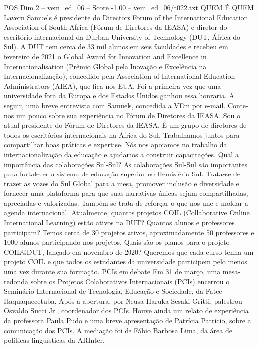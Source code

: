 \begin{textsample}{POS Dim 2 – vem\_ed\_06 – Score -1.00 – vem\_ed\_06/t022.txt}  \label{ex:f2_pos_045}
QUEM É QUEM Lavern Samuels é presidente do Directors Forum of the International Education Association of South Africa (Fórum de Diretores da IEASA) e diretor do escritório internacional da Durban University of Technology (DUT, África do Sul).
A DUT tem cerca de 33 mil alunos em seis faculdades e recebeu em fevereiro de 2021 o Global Award for Innovation and Excellence in Internationalisation (Prêmio Global pela Inovação e Excelência na Internacionalização), concedido pela Association of International Education Administrators (AIEA), que fica nos EUA.
Foi a primeira vez que uma universidade fora da Europa e dos Estados Unidos ganhou essa honraria.
A seguir, uma breve entrevista com Samuels, concedida a VEm por e-mail.
Conte-nos um pouco sobre sua experiência no Fórum de Diretores da IEASA.
Sou o atual presidente do Fórum de Diretores da IEASA.
É um grupo de diretores de todos os escritórios internacionais na África do Sul.
Trabalhamos juntos para compartilhar boas práticas e expertise.
Nós nos apoiamos no trabalho da internacionalização da educação e ajudamos a construir capacitações.
Qual a importância das colaborações Sul-Sul?
As colaborações Sul-Sul são importantes para fortalecer o sistema de educação superior no Hemisfério Sul.
Trata-se de trazer as vozes do Sul Global para a mesa, promover inclusão e diversidade e fornecer uma plataforma para que suas narrativas únicas sejam compartilhadas, apreciadas e valorizadas.
Também se trata de reforçar o que nos une e moldar a agenda internacional.
Atualmente, quantos projetos COIL (Collaborative Online International Learning) estão ativos na DUT?
Quantos alunos e professores participam?
Temos cerca de 30 projetos ativos, aproximadamente 50 professores e 1000 alunos participando nos projetos.
Quais são os planos para o projeto COIL@DUT, lançado em novembro de 2020?
Queremos que cada curso tenha um projeto COIL e que todos os estudantes da universidade participem pelo menos uma vez durante sua formação.
PCIs em debate Em 31 de março, uma mesa-redonda sobre os Projetos Colaborativos Internacionais (PCIs) encerrou o Seminário Internacional de Tecnologia, Educação e Sociedade, da Fatec Itaquaquecetuba.
Após a abertura, por Neusa Haruka Sesaki Gritti, palestrou Osvaldo Succi Jr., coordenador dos PCIs.
Houve ainda um relato de experiência da professora Paula Pudo e uma breve apresentação de Patrícia Patrício, sobre a comunicação dos PCIs.
A mediação foi de Fábio Barbosa Lima, da área de políticas linguísticas da ARInter.

\end{textsample}
